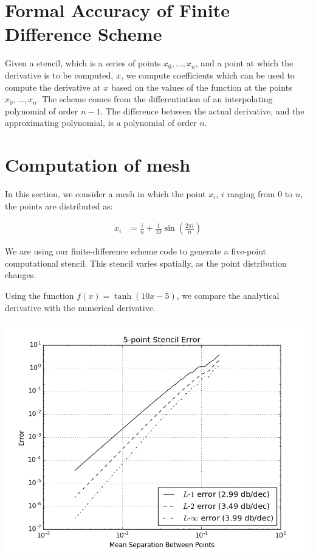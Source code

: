 \documentclass{article}
\begin{document}
\section{Formal Accuracy of Finite Difference Scheme}

Given a stencil, which is a series of points $x_0, \dots, x_n$, 
	and a point at which the derivative is to be computed,
	$x$, we compute coefficients which can be used to compute
	the derivative at $x$ based on the values of the function
	at the points $x_0, \dots, x_n$.
The scheme comes from the differentiation of an interpolating polynomial
	of order $n-1$.
The difference between the actual derivative, and the approximating
	polynomial, is a polynomial of order $n$.

\section{Computation of mesh}

In this section, we consider a mesh in which the point $x_i$, 
	$i$ ranging from $0$ to $n$, the points are distributed as:

\begin{align}
x_i & = \frac{i}{n} + \frac{1}{10} \sin \left( \frac{2 \pi i}{n} \right)
\end{align}

We are using our finite-difference scheme code to generate a five-point
	computational stencil.
This stencil varies spatially, as the point distribution changes.

Using the function $f(x) = \tanh ( 10 x - 5 )$, we compare the analytical
	derivative with the numerical derivative.

\includegraphics[width=\textwidth]{ErrorDecrease.png}
\end{document}
